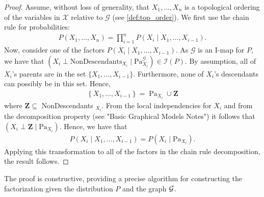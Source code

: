 \documentclass{article}
\begin{document}
\begin{proof}
Assume, without loss of generality, that $X_{1}, \ldots, X_{n}$ is a topological ordering of the variables in $\mathcal{X}$ relative to $\mathcal{G}$ (see \cref{def:top_order}). We first use the chain rule for probabilities:
\begin{align}
P\left(X_{1}, \ldots, X_{n}\right)=\prod_{i=1}^{n} P\left(X_{i} \mid X_{1}, \ldots, X_{i-1}\right) \label{eq:opoirdsa}.
\end{align}
Now, consider one of the factors $P\left(X_{i} \mid X_{1}, \ldots, X_{i-1}\right)$. As $\mathcal{G}$ is an I-map for $P$, we have that $\left(X_{i} \perp \mathrm{NonDescendants}_{X_{i}} \mid \mathrm{Pa}_{X_{i}}^{\mathcal{G}}\right) \in \mathcal{I}(P)$. By assumption, all of $X_{i}$'s parents are in the set $\{X_{1}, \ldots, X_{i-1}\}$. Furthermore, none of $X_{i}$'s descendants can possibly be in this set. Hence,
\begin{align*}
\left\{X_{1}, \ldots, X_{i-1}\right\}=\operatorname{Pa}_{X_{i}} \cup \boldsymbol{Z}
\end{align*}
where $\boldsymbol{Z} \subseteq$ NonDescendants $_{X_{i}} .$ From the local independencies for $X_{i}$ and from the decomposition property (see "Basic Graphical Models Notes") it follows that $\left(X_{i} \perp \boldsymbol{Z} \mid \mathrm{Pa}_{X_{i}}\right)$. Hence, we have that
\begin{align*}
P\left(X_{i} \mid X_{1}, \ldots, X_{i-1}\right)=P\left(X_{i} \mid \mathrm{Pa}_{X_{i}}\right) .
\end{align*}
Applying this transformation to all of the factors in the chain rule decomposition, the result follows.
\end{proof}
\begin{rema}
The proof is constructive, providing a precise algorithm for constructing the factorization given the distribution $P$ and the graph $\mathcal{G}$.
\end{rema}
\end{document}
